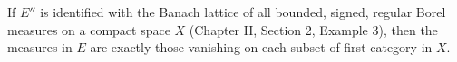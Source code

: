 If $E''$ is identified with the Banach lattice of all bounded, signed, regular Borel measures on a compact space $X$ (Chapter II, Section 2, Example 3), then the measures in $E$ are exactly those vanishing on each subset of first category in $X$.
